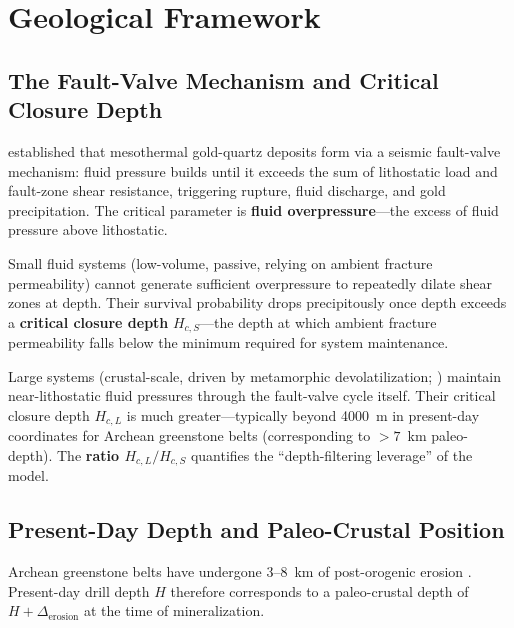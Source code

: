 \documentclass[11pt,a4paper]{article}
\begin{document}
\section{Geological Framework}

\subsection{The Fault-Valve Mechanism and Critical Closure Depth}

\cite{Sibson1988,Sibson2001} established that mesothermal gold-quartz deposits form via a seismic fault-valve mechanism: fluid pressure builds until it exceeds the sum of lithostatic load and fault-zone shear resistance, triggering rupture, fluid discharge, and gold precipitation.
The critical parameter is \textbf{fluid overpressure}---the excess of fluid pressure above lithostatic.

Small fluid systems (low-volume, passive, relying on ambient fracture permeability) cannot generate sufficient overpressure to repeatedly dilate shear zones at depth.
Their survival probability drops precipitously once depth exceeds a \textbf{critical closure depth} $H_{c,S}$---the depth at which ambient fracture permeability falls below the minimum required for system maintenance.

Large systems (crustal-scale, driven by metamorphic devolatilization; \cite{Goldfarb2005}) maintain near-lithostatic fluid pressures through the fault-valve cycle itself.
Their critical closure depth $H_{c,L}$ is much greater---typically beyond 4000~m in present-day coordinates for Archean greenstone belts (corresponding to $>7$~km paleo-depth).
The \textbf{ratio $H_{c,L}/H_{c,S}$} quantifies the ``depth-filtering leverage'' of the model.

\subsection{Present-Day Depth and Paleo-Crustal Position}\label{sec:paleo}

Archean greenstone belts have undergone 3--8~km of post-orogenic erosion \cite{Groves1998}.
Present-day drill depth $H$ therefore corresponds to a paleo-crustal depth of $H + \Delta_{\mathrm{erosion}}$ at the time of mineralization.
\end{document}
